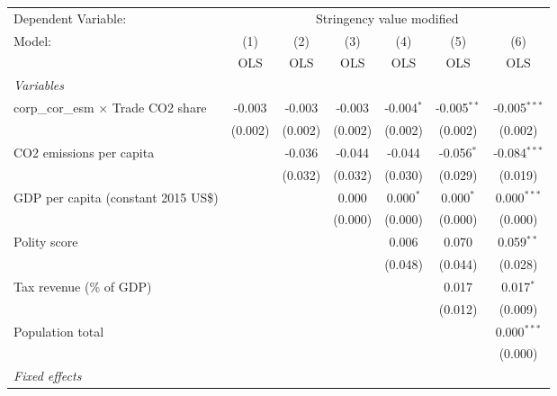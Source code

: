 
\begingroup
\centering
\begin{tabular}{lcccccc}
   \toprule
   Dependent Variable: & \multicolumn{6}{c}{Stringency value modified}\\
   Model:                                     & (1)     & (2)     & (3)     & (4)          & (5)           & (6)\\  
                                              &  OLS    & OLS     & OLS     & OLS          & OLS           & OLS\\  
   \midrule
   \emph{Variables}\\
   corp\_cor\_esm $\times$ Trade CO2 share    & -0.003  & -0.003  & -0.003  & -0.004$^{*}$ & -0.005$^{**}$ & -0.005$^{***}$\\   
                                              & (0.002) & (0.002) & (0.002) & (0.002)      & (0.002)       & (0.002)\\   
   CO2 emissions per capita                   &         & -0.036  & -0.044  & -0.044       & -0.056$^{*}$  & -0.084$^{***}$\\   
                                              &         & (0.032) & (0.032) & (0.030)      & (0.029)       & (0.019)\\   
   GDP per capita (constant 2015 US\$)        &         &         & 0.000   & 0.000$^{*}$  & 0.000$^{*}$   & 0.000$^{***}$\\   
                                              &         &         & (0.000) & (0.000)      & (0.000)       & (0.000)\\   
   Polity score                               &         &         &         & 0.006        & 0.070         & 0.059$^{**}$\\   
                                              &         &         &         & (0.048)      & (0.044)       & (0.028)\\   
   Tax revenue (\% of GDP)                    &         &         &         &              & 0.017         & 0.017$^{*}$\\   
                                              &         &         &         &              & (0.012)       & (0.009)\\   
   Population total                           &         &         &         &              &               & 0.000$^{***}$\\   
                                              &         &         &         &              &               & (0.000)\\   
   \emph{Fixed effects}\\

\end{tabular}
